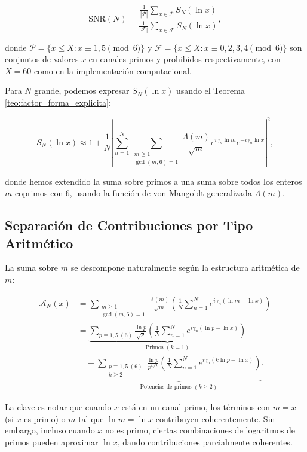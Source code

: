 \documentclass[12pt, a4paper]{article}
\theoremstyle{plain}
\theoremstyle{definition}
\theoremstyle{remark}
\begin{document}
\[
\mathrm{SNR}(N) = \frac{\displaystyle \frac{1}{|\mathcal{P}|} \sum_{x \in \mathcal{P}} S_N(\ln x)}{\displaystyle \frac{1}{|\mathcal{F}|} \sum_{x \in \mathcal{F}} S_N(\ln x)},
\]

donde $\mathcal{P} = \{x \leq X : x \equiv 1,5 \pmod{6}\}$ y $\mathcal{F} = \{x \leq X : x \equiv 0,2,3,4 \pmod{6}\}$ son conjuntos de valores $x$ en canales primos y prohibidos respectivamente, con $X = 60$ como en la implementación computacional.

Para $N$ grande, podemos expresar $S_N(\ln x)$ usando el Teorema \ref{teo:factor_forma_explicita}:

\[
S_N(\ln x) \approx 1 + \frac{1}{N} \left| \sum_{n=1}^N \sum_{\substack{m \geq 1 \\ \gcd(m,6)=1}} \frac{\Lambda(m)}{\sqrt{m}} e^{i\gamma_n \ln m} e^{-i\gamma_n \ln x} \right|^2,
\]

donde hemos extendido la suma sobre primos a una suma sobre todos los enteros $m$ coprimos con 6, usando la función de von Mangoldt generalizada $\Lambda(m)$.

\subsection{Separación de Contribuciones por Tipo Aritmético}

La suma sobre $m$ se descompone naturalmente según la estructura aritmética de $m$:

\begin{align*}
\mathcal{A}_N(x) &= \sum_{\substack{m \geq 1 \\ \gcd(m,6)=1}} \frac{\Lambda(m)}{\sqrt{m}} \left( \frac{1}{N} \sum_{n=1}^N e^{i\gamma_n (\ln m - \ln x)} \right) \\
&= \underbrace{\sum_{p \equiv 1,5 \ (6)} \frac{\ln p}{\sqrt{p}} \left( \frac{1}{N} \sum_{n=1}^N e^{i\gamma_n (\ln p - \ln x)} \right)}_{\text{Primos }(k=1)} \\
&\quad + \underbrace{\sum_{\substack{p \equiv 1,5 \ (6) \\ k \geq 2}} \frac{\ln p}{p^{k/2}} \left( \frac{1}{N} \sum_{n=1}^N e^{i\gamma_n (k\ln p - \ln x)} \right)}_{\text{Potencias de primos }(k \geq 2)}.
\end{align*}

La clave es notar que cuando $x$ está en un canal primo, los términos con $m = x$ (si $x$ es primo) o $m$ tal que $\ln m = \ln x$ contribuyen coherentemente. Sin embargo, incluso cuando $x$ no es primo, ciertas combinaciones de logaritmos de primos pueden aproximar $\ln x$, dando contribuciones parcialmente coherentes.
\end{document}
